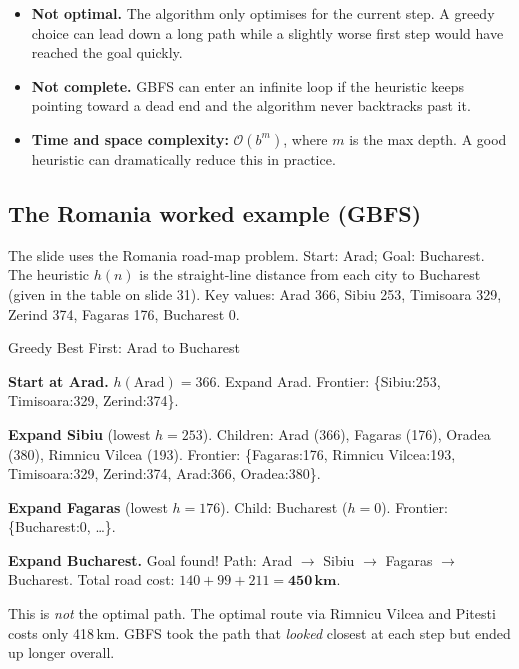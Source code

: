 \documentclass[a4paper,11pt]{article}
\begin{document}
\begin{itemize}
  \item \textbf{Not optimal.} The algorithm only optimises for the current
    step. A greedy choice can lead down a long path while a slightly worse
    first step would have reached the goal quickly.
  \item \textbf{Not complete.} GBFS can enter an infinite loop if the
    heuristic keeps pointing toward a dead end and the algorithm never
    backtracks past it.
  \item \textbf{Time and space complexity:} $\mathcal{O}(b^{m})$, where $m$
    is the max depth. A good heuristic can dramatically reduce this in
    practice.
\end{itemize}

\subsection*{The Romania worked example (GBFS)}

The slide uses the Romania road-map problem. Start: Arad; Goal: Bucharest.
The heuristic $h(n)$ is the straight-line distance from each city to
Bucharest (given in the table on slide 31). Key values:
Arad 366, Sibiu 253, Timisoara 329, Zerind 374, Fagaras 176, Bucharest 0.

\begin{worked}{Greedy Best First: Arad to Bucharest}
\begin{steps}
  \item \textbf{Start at Arad.} $h(\text{Arad})=366$. Expand Arad.
        Frontier: \{Sibiu:253, Timisoara:329, Zerind:374\}.
  \item \textbf{Expand Sibiu} (lowest $h=253$).
        Children: Arad (366), Fagaras (176), Oradea (380),
        Rimnicu Vilcea (193).
        Frontier: \{Fagaras:176, Rimnicu Vilcea:193, Timisoara:329,
        Zerind:374, Arad:366, Oradea:380\}.
  \item \textbf{Expand Fagaras} (lowest $h=176$).
        Child: Bucharest ($h=0$).
        Frontier: \{Bucharest:0, \ldots\}.
  \item \textbf{Expand Bucharest.} Goal found!
        Path: Arad $\to$ Sibiu $\to$ Fagaras $\to$ Bucharest.
        Total road cost: $140+99+211 = \mathbf{450\,km}$.
\end{steps}
This is \emph{not} the optimal path. The optimal route via Rimnicu
Vilcea and Pitesti costs only 418\,km. GBFS took the path that
\emph{looked} closest at each step but ended up longer overall.
\end{worked}
\end{document}
